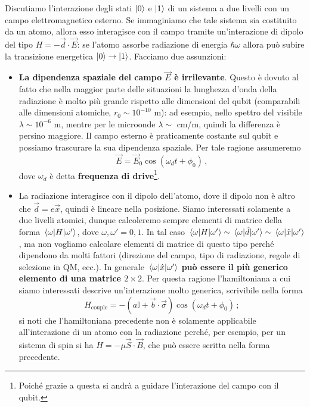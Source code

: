 \noindent Discutiamo l'interazione degli stati $\ket{0}$ e $\ket{1}$ di un sistema a due livelli con un campo elettromagnetico esterno. Se immaginiamo che tale sistema sia costituito da un atomo, allora esso interagisce con il campo tramite un'interazione di dipolo del tipo $H = -\vec{d} \cdot \vec{E}$: se l'atomo assorbe radiazione di energia $\hbar \omega$ allora può subire la transizione energetica $\ket{0} \to \ket{1}$. Facciamo due assunzioni:
\begin{itemize}
    \item \textbf{La dipendenza spaziale del campo $\vec{E}$ è irrilevante}. Questo è dovuto al fatto che nella maggior parte delle situazioni la lunghezza d'onda della radiazione è molto più grande rispetto alle dimensioni del qubit (comparabili alle dimensioni atomiche, $r_0 \sim 10^{-10}$ m): ad esempio, nello spettro del visibile $\lambda \sim 10^{-6}$ m, mentre per le microonde $\lambda \sim $ cm/m, quindi la differenza è persino maggiore. Il campo esterno è praticamente costante sul qubit e possiamo trascurare la sua dipendenza spaziale. Per tale ragione assumeremo
    \begin{equation*}
        \vec{E} = \vec{E}_0 \cos (\omega_d t + \phi_0) \, ,
    \end{equation*}
    dove $\omega_d$ è detta \textbf{frequenza di drive}\footnote{Poiché grazie a questa si andrà a guidare l'interazione del campo con il qubit.}. 
    
    \item La radiazione interagisce con il dipolo dell'atomo, dove il dipolo non è altro che $\vec{d} = e \vec{x}$, quindi è lineare nella posizione. Siamo interessati solamente a due livelli atomici, dunque calcoleremo sempre elementi di matrice della forma $\mel{\omega}{H}{\omega'}$, dove $\omega, \omega' = 0,1$. In tal caso $\mel{\omega}{H}{\omega'} \sim \mel{\omega}{\hat{d}}{\omega'} \sim \mel{\omega}{\hat{x}}{\omega'}$, ma non vogliamo calcolare elementi di matrice di questo tipo perché dipendono da molti fattori (direzione del campo, tipo di radiazione, regole di selezione in QM, ecc.). In generale \textbf{$\mel{\omega}{\hat{x}}{\omega'}$ pu\`o essere il più generico elemento di una matrice $2 \times 2$}. Per questa ragione l'hamiltoniana a cui siamo interessati descrive un'interazione molto generica, scrivibile nella forma
    \begin{equation}\label{H_couple}
        H_{\text{couple}} = - \left( a \mathbb{I} + \vec{b} \cdot \vec{\sigma} \right) \cos (\omega_d t + \phi_0) \, ;
    \end{equation}
    si noti che l'hamiltoniana precedente non è solamente applicabile all'interazione di un atomo con la radiazione perché, per esempio, per un sistema di spin si ha $H = - \mu \vec{S} \cdot \vec{B}$, che può essere scritta nella forma precedente. 
\end{itemize}


